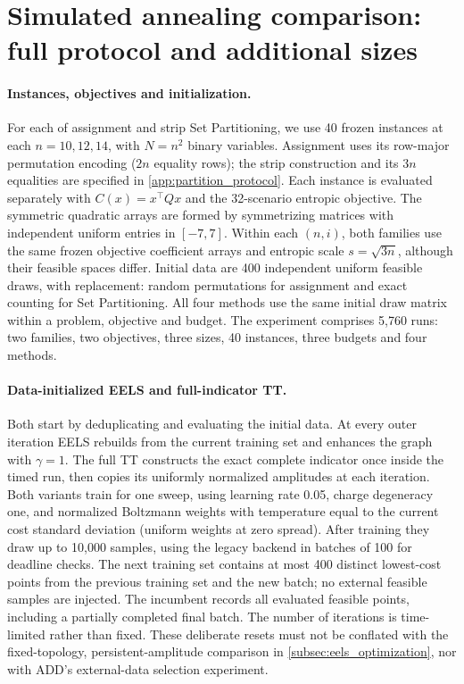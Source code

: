 \section{Simulated annealing comparison: full protocol and additional sizes}
\label{app:sa_protocol}
\paragraph{Instances, objectives and initialization.}
For each of assignment and strip Set Partitioning, we use 40 frozen instances
at each $n=10,12,14$, with $N=n^2$ binary variables. Assignment uses its
row-major permutation encoding ($2n$ equality rows); the strip construction
and its $3n$ equalities are specified in \cref{app:partition_protocol}.
Each instance is evaluated separately with $C(x)=x^\top Qx$ and the 32-scenario
entropic objective. The symmetric quadratic arrays are formed by symmetrizing
matrices with independent uniform entries in $[-7,7]$. Within each $(n,i)$,
both families use the same frozen objective coefficient arrays and entropic
scale $s=\sqrt{3n}$, although their feasible spaces differ. Initial data are
400 independent uniform feasible draws, with replacement: random permutations
for assignment and exact counting for Set Partitioning. All four methods use
the same initial draw matrix within a problem, objective and budget.
The experiment comprises 5,760 runs: two families, two objectives, three sizes,
40 instances, three budgets and four methods.

\paragraph{Data-initialized EELS and full-indicator TT.}
Both start by deduplicating and evaluating the initial data. At every outer
iteration EELS rebuilds from the current training set and enhances the graph
with $\gamma=1$. The full TT constructs the exact complete indicator once
inside the timed run, then copies its uniformly normalized amplitudes at each
iteration. Both variants train for one sweep, using learning rate 0.05,
charge degeneracy one, and normalized Boltzmann weights with temperature
equal to the current cost standard deviation (uniform weights at zero spread).
After training they draw up to 10,000 samples, using the legacy backend in
batches of 100 for deadline checks. The next training set contains at most
400 distinct lowest-cost points from the previous training set and the new
batch; no external feasible samples are injected. The incumbent records all
evaluated feasible points, including a partially completed final batch.
The number of iterations is time-limited rather than fixed. These deliberate
resets must not be conflated with the fixed-topology, persistent-amplitude
comparison in \cref{subsec:eels_optimization}, nor with ADD's external-data
selection experiment.

